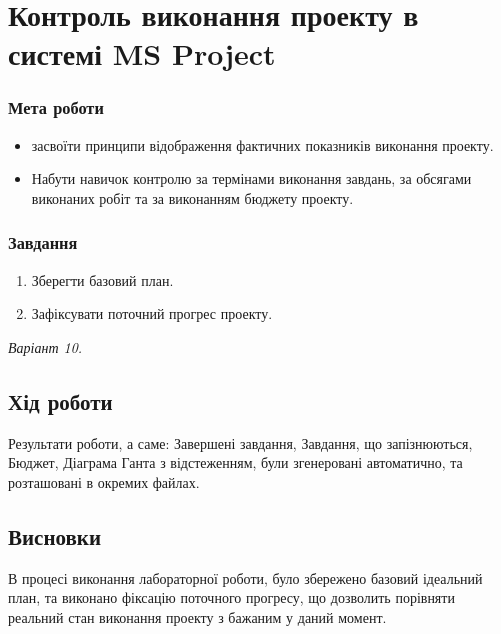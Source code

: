 



\newcommand{\labnumber}{4}



\graphicspath{{figures/}}


\Ukrainian


\addtocounter{page}{1}

\section*{Контроль виконання проекту в системі MS Project}
\subsubsection*{Мета роботи}
\begin{itemize}
	\item засвоїти принципи відображення фактичних показників виконання проекту.
	\item Набути навичок контролю за термінами виконання завдань, за обсягами виконаних робіт та за виконанням бюджету проекту.
\end{itemize}

\subsubsection*{Завдання}
\begin{enumerate}
  	\item Зберегти базовий план.
  	\item Зафіксувати поточний прогрес проекту.
\end{enumerate}

\textit{Варіант 10.}

\subsection*{Хід роботи}
Результати роботи, а саме: Завершені завдання, Завдання, що запізнюються, Бюджет, Діаграма Ганта з відстеженням, були згенеровані автоматично, та розташовані в окремих файлах.

\subsection*{Висновки}
В процесі виконання лабораторної роботи, було збережено базовий ідеальний план, та виконано фіксацію поточного прогресу, що дозволить порівняти реальний стан виконання проекту з бажаним у даний момент.


